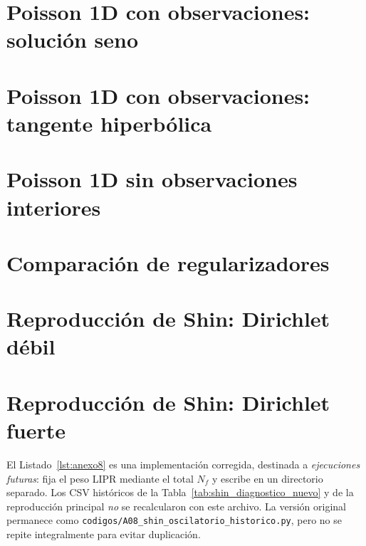 \section{Poisson 1D con observaciones: solución seno}
\label{app:experimento3}


\section{Poisson 1D con observaciones: tangente hiperbólica}
\label{app:experimento4}


\section{Poisson 1D sin observaciones interiores}
\label{app:experimento5}


\section{Comparación de regularizadores}
\label{app:experimento6}


\section{Reproducción de Shin: Dirichlet débil}
\label{app:experimento7}


\section{Reproducción de Shin: Dirichlet fuerte}
\label{app:experimento8}
\noindent El Listado~\ref{lst:anexo8} es una implementación corregida, destinada a \emph{ejecuciones futuras}: fija el peso LIPR mediante el total $N_f$ y escribe en un directorio separado. Los CSV históricos de la Tabla~\ref{tab:shin_diagnostico_nuevo} y de la reproducción principal \emph{no} se recalcularon con este archivo. La versión original permanece como \texttt{codigos/A08\_shin\_oscilatorio\_historico.py}, pero no se repite integralmente para evitar duplicación.


